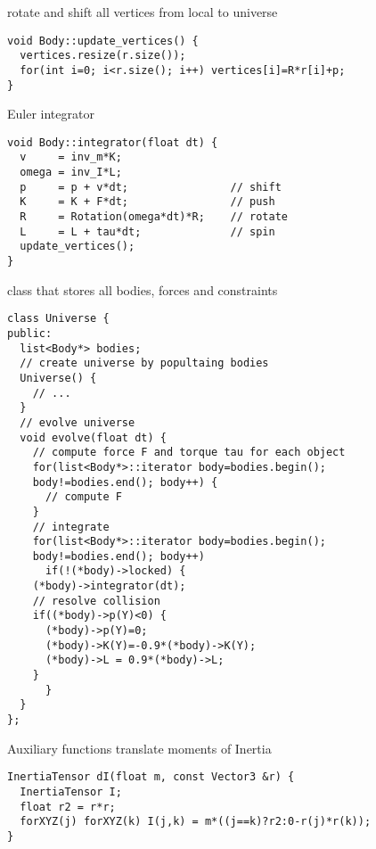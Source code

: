 rotate and shift all vertices from local to universe
\begin{lstlisting}
void Body::update_vertices() {
  vertices.resize(r.size());
  for(int i=0; i<r.size(); i++) vertices[i]=R*r[i]+p;
}
\end{lstlisting}

Euler integrator
\begin{lstlisting}
void Body::integrator(float dt) {
  v     = inv_m*K;
  omega = inv_I*L;
  p     = p + v*dt;                // shift
  K     = K + F*dt;                // push
  R     = Rotation(omega*dt)*R;    // rotate
  L     = L + tau*dt;              // spin
  update_vertices();
}
\end{lstlisting}

class that stores all bodies, forces and constraints
\begin{lstlisting}
class Universe {
public:
  list<Body*> bodies;
  // create universe by popultaing bodies
  Universe() {
    // ...
  }
  // evolve universe
  void evolve(float dt) {
    // compute force F and torque tau for each object
    for(list<Body*>::iterator body=bodies.begin();
	body!=bodies.end(); body++) {
      // compute F
    }
    // integrate
    for(list<Body*>::iterator body=bodies.begin();
	body!=bodies.end(); body++) 
      if(!(*body)->locked) {
	(*body)->integrator(dt);
	// resolve collision
	if((*body)->p(Y)<0) {
	  (*body)->p(Y)=0;
	  (*body)->K(Y)=-0.9*(*body)->K(Y);
	  (*body)->L = 0.9*(*body)->L;
	}
      }
  }
};
\end{lstlisting}

Auxiliary functions translate moments of Inertia
\begin{lstlisting}
InertiaTensor dI(float m, const Vector3 &r) {
  InertiaTensor I;
  float r2 = r*r;
  forXYZ(j) forXYZ(k) I(j,k) = m*((j==k)?r2:0-r(j)*r(k));
}
\end{lstlisting}

